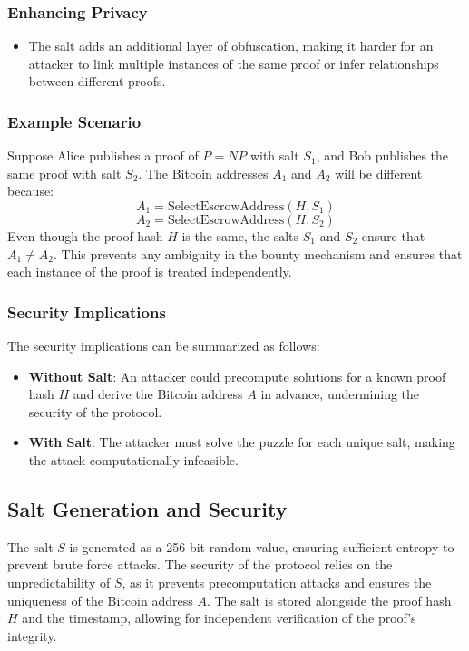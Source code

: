 \documentclass[12pt]{report}
\begin{document}
\subsubsection{Enhancing Privacy}
\begin{itemize}
    \item The salt adds an additional layer of obfuscation, making it harder for an attacker to link multiple instances of the same proof or infer relationships between different proofs.
\end{itemize}

\subsubsection{Example Scenario}
Suppose Alice publishes a proof of \( P = NP \) with salt \( S_1 \), and Bob publishes the same proof with salt \( S_2 \). The Bitcoin addresses \( A_1 \) and \( A_2 \) will be different because:
\[
A_1 = \text{SelectEscrowAddress}(H, S_1)
\]
\[
A_2 = \text{SelectEscrowAddress}(H, S_2)
\]
Even though the proof hash \( H \) is the same, the salts \( S_1 \) and \( S_2 \) ensure that \( A_1 \neq A_2 \). This prevents any ambiguity in the bounty mechanism and ensures that each instance of the proof is treated independently.

\subsubsection{Security Implications}
The security implications can be summarized as follows:
\begin{itemize}
    \item \textbf{Without Salt}: An attacker could precompute solutions for a known proof hash \( H \) and derive the Bitcoin address \( A \) in advance, undermining the security of the protocol.
    \item \textbf{With Salt}: The attacker must solve the puzzle for each unique salt, making the attack computationally infeasible.
\end{itemize}

\subsection{Salt Generation and Security}
The salt \( S \) is generated as a 256-bit random value, ensuring sufficient entropy to prevent brute force attacks. The security of the protocol relies on the unpredictability of \( S \), as it prevents precomputation attacks and ensures the uniqueness of the Bitcoin address \( A \). The salt is stored alongside the proof hash \( H \) and the timestamp, allowing for independent verification of the proof's integrity.
\end{document}
